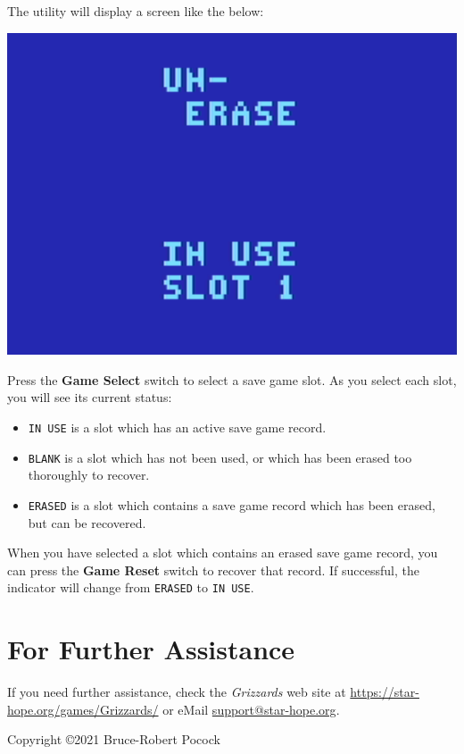 \documentclass[article]{memoir}
\begin{document}
The utility will display a screen like the below:

\includegraphics[width=\columnwidth]{../Manual/Unerase.png}

Press the \textbf{Game Select} switch to select a save game slot. As you
select each slot, you will see its current status:

\begin{itemize}
\item \texttt{IN USE} is a slot which has an active save game record.
\item \texttt{BLANK}  is a slot  which has not  been used, or  which has
  been erased too thoroughly to recover.
\item \texttt{ERASED} is a slot which  contains a save game record which
  has been erased, but can be recovered.
\end{itemize}

When you have selected a slot which contains an erased save game record,
you can  press the  \textbf{Game Reset} switch  to recover  that record.
If  successful,  the  indicator  will  change  from  \texttt{ERASED}  to
\texttt{IN USE}.

\section*{For Further Assistance}

If you need further assistance, check the \textit{Grizzards} web site at
\href{https://star-hope.org/games/Grizzards/}{https://\-star-hope.org/\-games/\-Grizzards/}
or eMail \href{mailto:support@star-hope.org}{support@star-hope.org}.

\vfill

Copyright \copyright 2021 Bruce-Robert Pocock
\end{document}
